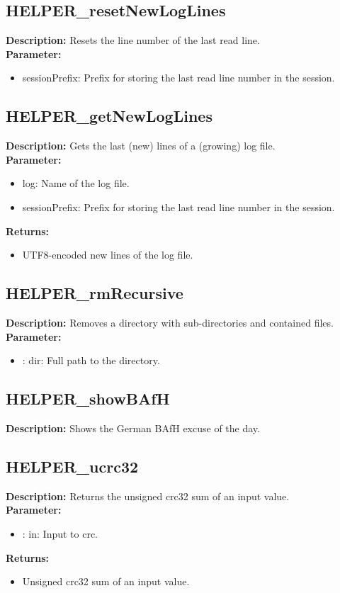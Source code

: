 \subsection{HELPER\_resetNewLogLines}
\textbf{Description:} Resets the line number of the last read line.\\
\textbf{Parameter:}
\begin{itemize}
\item sessionPrefix: Prefix for storing the last read line number in the session.
\end{itemize}

\subsection{HELPER\_getNewLogLines}
\textbf{Description:} Gets the last (new) lines of a (growing) log file.\\
\textbf{Parameter:}
\begin{itemize}
\item log: Name of the log file.
\item sessionPrefix: Prefix for storing the last read line number in the session.
\end{itemize}
\textbf{Returns:}
\begin{itemize}
\item UTF8-encoded new lines of the log file.
\end{itemize}

\subsection{HELPER\_rmRecursive}
\textbf{Description:} Removes a directory with sub-directories and contained files.\\
\textbf{Parameter:}
\begin{itemize}
\item : dir: Full path to the directory.
\end{itemize}

\subsection{HELPER\_showBAfH}
\textbf{Description:} Shows the German BAfH excuse of the day.\\

\subsection{HELPER\_ucrc32}
\textbf{Description:} Returns the unsigned crc32 sum of an input value.\\
\textbf{Parameter:}
\begin{itemize}
\item : in: Input to crc.
\end{itemize}
\textbf{Returns:}
\begin{itemize}
\item Unsigned crc32 sum of an input value.
\end{itemize}

